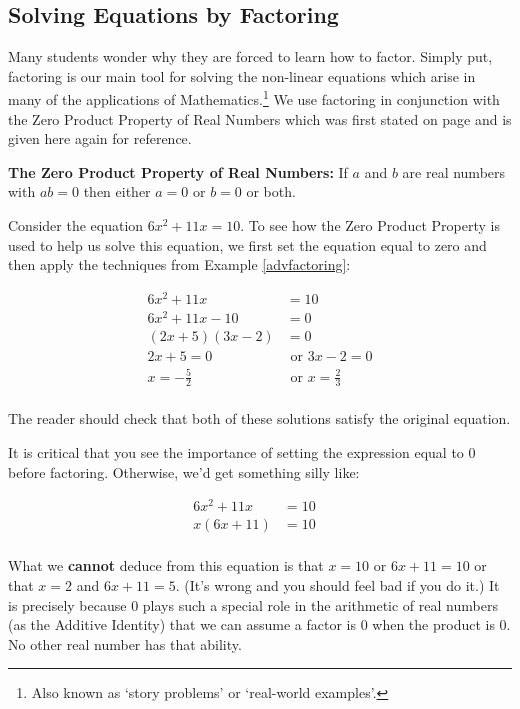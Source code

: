 \subsection{Solving Equations by Factoring}
\label{solveeqnsbyfactoring}

Many students wonder why they are forced to learn how to factor.  Simply put, factoring is our main tool for solving the non-linear equations which arise in many of the applications of Mathematics.\footnote{Also known as `story problems' or `real-world examples'.}  We use factoring in conjunction with the Zero Product Property of Real Numbers which was first stated on page \pageref{propertiesofzero} and is given here again for reference.

\begin{tcolorbox}
  
\textbf{The Zero Product Property of Real Numbers:}  If $a$ and $b$ are real numbers with $ab = 0$ then either $a = 0$ or $b = 0$ or both.

\end{tcolorbox}

Consider the equation $6x^2 + 11x = 10$.  To see how the Zero Product Property is used to help us solve this equation, we first set the equation equal to zero and then apply the techniques from Example \ref{advfactoring}:

\begin{align*}
6x^2 + 11x & = 10 \\
6x^2 + 11x - 10 & = 0 \tag{Subtract $10$ from both sides} \\
(2x+5)(3x-2) & = 0 \tag{Factor} \\
2x +5 = 0 & \text{ or } 3x -2 = 0 \tag{Zero Product Property with $a = 2x+5, b = 3x-2$} \\
x = -\frac{5}{2} & \text{ or } x = \frac{2}{3} \\
\end{align*}

The reader should check that both of these solutions satisfy the original equation.

It is critical that you see the importance of setting the expression equal to $0$ before factoring. Otherwise, we'd get something silly like:

\begin{align*}
6x^2 + 11x & = 10 \\
x(6x + 11) & = 10 & \tag{Factor} \\
\end{align*}

What we \textbf{cannot} deduce from this equation is that $x = 10$ or $6x+11 = 10$ or that $x = 2$ and $6x+11 = 5$.  (It's wrong and you should feel bad if you do it.)  It is precisely because $0$ plays such a special role in the arithmetic of real numbers (as the Additive Identity) that we can assume a factor is $0$ when the product is $0$.  No other real number has that ability.

